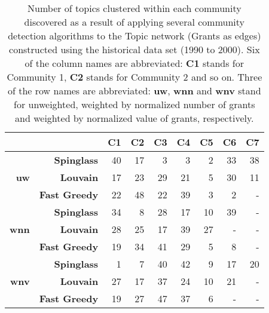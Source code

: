 \begin{table}[!htbp]
\centering
\caption[Number of topics clustered within each community discovered in the Topic network (Grants as edges) constructed using the historical data set (1990 to 2000)]{Number of topics clustered within each community discovered as a result of applying several community detection algorithms to the Topic network (Grants as edges) constructed using the historical data set (1990 to 2000). Six of the column names are abbreviated: \textbf{C1} stands for Community 1, \textbf{C2} stands for Community 2 and so on. Three of the row names are abbreviated: \textbf{uw}, \textbf{wnn} and \textbf{wnv} stand for unweighted, weighted by normalized number of grants and weighted by normalized value of grants, respectively.}
\label{table:topic_a_historical2_numbers_appendix}
\begin{tabular}{r|r|r|r|r|r|r|r|r}
\textbf{} & \textbf{} & \textbf{C1} & \textbf{C2} & \textbf{C3} & \textbf{C4} & \textbf{C5} & \textbf{C6} & \textbf{C7}\\
\hline
\multirow{3}{*}{\textbf{uw}}
& \textbf{Spinglass} & {40} & {17} & {3} & {3} & {2} & {33} & {38}\\
& \textbf{Louvain} & {17} & {23} & {29} & {21} & {5} & {30} & {11}\\
& \textbf{Fast Greedy} & {22} & {48} & {22} & {39} & {3} & {2} & {-}\\
\hline
\multirow{3}{*}{\textbf{wnn}}
& \textbf{Spinglass} & {34} & {8} & {28} & {17} & {10} & {39} & {-}\\
& \textbf{Louvain} & {28} & {25} & {17} & {39} & {27} & {-} & {-}\\
& \textbf{Fast Greedy} & {19} & {34} & {41} & {29} & {5} & {8} & {-}\\
\hline
\multirow{3}{*}{\textbf{wnv}}
& \textbf{Spinglass} & {1} & {7} & {40} & {42} & {9} & {17} & {20}\\
& \textbf{Louvain} & {27} & {17} & {37} & {24} & {10} & {21} & {-}\\
& \textbf{Fast Greedy} & {19} & {27} & {47} & {37} & {6} & {-} & {-}
\end{tabular}
\end{table}

